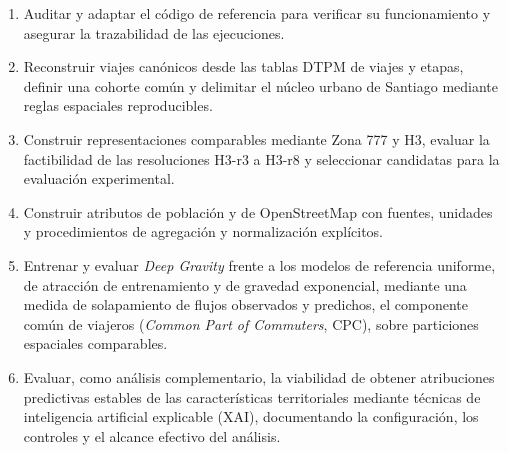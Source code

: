 \begin{enumerate}
    \item Auditar y adaptar el código de referencia para verificar su funcionamiento y asegurar la trazabilidad de las ejecuciones.
    \item Reconstruir viajes canónicos desde las tablas DTPM de viajes y etapas, definir una cohorte común y delimitar el núcleo urbano de Santiago mediante reglas espaciales reproducibles.
    \item Construir representaciones comparables mediante Zona 777 y H3, evaluar la factibilidad de las resoluciones H3-r3 a H3-r8 y seleccionar candidatas para la evaluación experimental.
    \item Construir atributos de población y de OpenStreetMap con fuentes, unidades y procedimientos de agregación y normalización explícitos.
    \item Entrenar y evaluar \textit{Deep Gravity} frente a los modelos de referencia uniforme, de atracción de entrenamiento y de gravedad exponencial, mediante una medida de solapamiento de flujos observados y predichos, el componente común de viajeros (\textit{Common Part of Commuters}, CPC), sobre particiones espaciales comparables.
    \item Evaluar, como análisis complementario, la viabilidad de obtener atribuciones predictivas estables de las características territoriales mediante técnicas de inteligencia artificial explicable (XAI), documentando la configuración, los controles y el alcance efectivo del análisis.
\end{enumerate}

